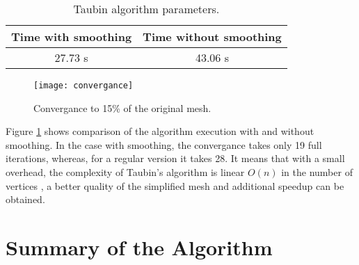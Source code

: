 \begin{table}[h!]
\centering
\begin{tabular}{ |c|c| } 
 \hline
 Time with smoothing & Time without smoothing\\
 \hline
 27.73 s & 43.06 s\\ 
 \hline
\end{tabular}
\caption{Taubin algorithm parameters.}
\label{fig:time_speedup}
\end{table}

\begin{figure}[h!]
  \begin{center}
    \texttt{[image: convergance]}
    \caption{Convergance to 15\% of the original mesh.}
    \label{fig:convergance}
  \end{center}
\end{figure}

Figure \ref{fig:convergance} shows comparison of the algorithm execution with and without smoothing. In the case with smoothing, the convergance takes only 19 full iterations, whereas, for a regular version it takes 28. It means that with a small overhead, the complexity of Taubin's algorithm is linear $O(n)$ in the number of vertices \cite{taubin95}, a better quality of the simplified mesh and additional speedup can be obtained.

\newpage
\section{Summary of the Algorithm}

